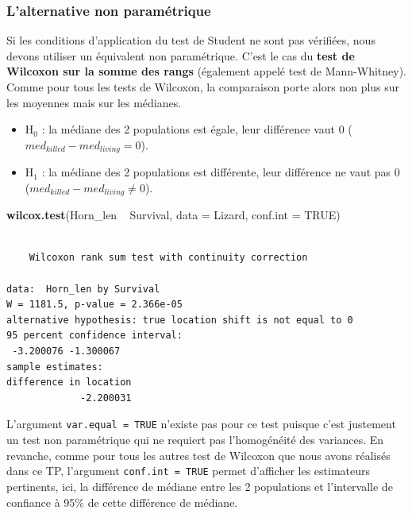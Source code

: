 \documentclass[a4paperpaper,]{article}
\newenvironment{Shaded}{\begin{snugshade}}{\end{snugshade}}
\newcommand{\DataTypeTok}[1]{\textcolor[rgb]{0.00,0.34,0.68}{#1}}
\newcommand{\KeywordTok}[1]{\textcolor[rgb]{0.12,0.11,0.11}{\textbf{#1}}}
\newcommand{\NormalTok}[1]{\textcolor[rgb]{0.12,0.11,0.11}{#1}}
\newcommand{\OperatorTok}[1]{\textcolor[rgb]{0.12,0.11,0.11}{#1}}
\newcommand{\OtherTok}[1]{\textcolor[rgb]{0.00,0.43,0.16}{#1}}
\newcommand{\StringTok}[1]{\textcolor[rgb]{0.75,0.01,0.01}{#1}}
\providecommand{\tightlist}{%
  \setlength{\itemsep}{0pt}\setlength{\parskip}{0pt}}
\begin{document}
\hypertarget{lalternative-non-parametrique-2}{%
\subsubsection{L'alternative non paramétrique}\label{lalternative-non-parametrique-2}}

Si les conditions d'application du test de Student ne sont pas vérifiées, nous devons utiliser un équivalent non paramétrique. C'est le cas du \textbf{test de Wilcoxon sur la somme des rangs} (également appelé test de Mann-Whitney). Comme pour tous les tests de Wilcoxon, la comparaison porte alors non plus sur les moyennes mais sur les médianes.

\begin{itemize}
\tightlist
\item
  H\(_0\) : la médiane des 2 populations est égale, leur différence vaut 0 (\(med_{killed}-med_{living} = 0\)).
\item
  H\(_1\) : la médiane des 2 populations est différente, leur différence ne vaut pas 0 (\(med_{killed}-med_{living}\neq 0\)).
\end{itemize}

\begin{Shaded}
\begin{Highlighting}[]
\KeywordTok{wilcox.test}\NormalTok{(Horn_len }\OperatorTok{~}\StringTok{ }\NormalTok{Survival, }\DataTypeTok{data =}\NormalTok{ Lizard, }\DataTypeTok{conf.int =} \OtherTok{TRUE}\NormalTok{)}
\end{Highlighting}
\end{Shaded}

\begin{verbatim}

    Wilcoxon rank sum test with continuity correction

data:  Horn_len by Survival
W = 1181.5, p-value = 2.366e-05
alternative hypothesis: true location shift is not equal to 0
95 percent confidence interval:
 -3.200076 -1.300067
sample estimates:
difference in location 
             -2.200031 
\end{verbatim}

L'argument \texttt{var.equal\ =\ TRUE} n'existe pas pour ce test puisque c'est justement un test non paramétrique qui ne requiert pas l'homogénéité des variances. En revanche, comme pour tous les autres test de Wilcoxon que nous avons réalisés dans ce TP, l'argument \texttt{conf.int\ =\ TRUE} permet d'afficher les estimateurs pertinents, ici, la différence de médiane entre les 2 populations et l'intervalle de confiance à 95\% de cette différence de médiane.
\end{document}
